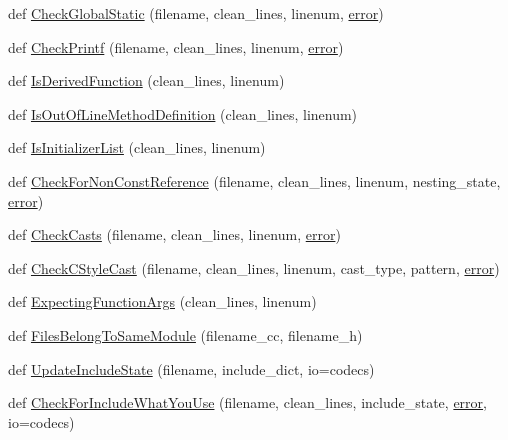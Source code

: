\begin{DoxyCompactItemize}
\item 
def \hyperlink{namespacecpplint_a64fc322bcf08988b43f003ff495fbabb}{Check\+Global\+Static} (filename, clean\+\_\+lines, linenum, \hyperlink{_07copy_08_2_read_camera_model_8m_ac546fdc9911f4a876dbfaffbc7426f8b}{error})
\item 
def \hyperlink{namespacecpplint_aaa8b988b9e83ad1c8964ecc0739d52e5}{Check\+Printf} (filename, clean\+\_\+lines, linenum, \hyperlink{_07copy_08_2_read_camera_model_8m_ac546fdc9911f4a876dbfaffbc7426f8b}{error})
\item 
def \hyperlink{namespacecpplint_ac8519cf084d818c931eac29994b03f55}{Is\+Derived\+Function} (clean\+\_\+lines, linenum)
\item 
def \hyperlink{namespacecpplint_a52e4468f674e140c256254eb0d1cf007}{Is\+Out\+Of\+Line\+Method\+Definition} (clean\+\_\+lines, linenum)
\item 
def \hyperlink{namespacecpplint_ae06fb1dd669681214573c0441b7e854f}{Is\+Initializer\+List} (clean\+\_\+lines, linenum)
\item 
def \hyperlink{namespacecpplint_a97f01c7d6e7e6d38b52744ab393d4160}{Check\+For\+Non\+Const\+Reference} (filename, clean\+\_\+lines, linenum, nesting\+\_\+state, \hyperlink{_07copy_08_2_read_camera_model_8m_ac546fdc9911f4a876dbfaffbc7426f8b}{error})
\item 
def \hyperlink{namespacecpplint_a59c5f44ae1dbedad109809d46e80588e}{Check\+Casts} (filename, clean\+\_\+lines, linenum, \hyperlink{_07copy_08_2_read_camera_model_8m_ac546fdc9911f4a876dbfaffbc7426f8b}{error})
\item 
def \hyperlink{namespacecpplint_ac23d9b29d869054db2ece1e7d5196349}{Check\+C\+Style\+Cast} (filename, clean\+\_\+lines, linenum, cast\+\_\+type, pattern, \hyperlink{_07copy_08_2_read_camera_model_8m_ac546fdc9911f4a876dbfaffbc7426f8b}{error})
\item 
def \hyperlink{namespacecpplint_a7657def0315cfe229ba436632f2d5042}{Expecting\+Function\+Args} (clean\+\_\+lines, linenum)
\item 
def \hyperlink{namespacecpplint_a66083e7d453e845a2751e76043fcd9ea}{Files\+Belong\+To\+Same\+Module} (filename\+\_\+cc, filename\+\_\+h)
\item 
def \hyperlink{namespacecpplint_a127416bee5c376937479b3119a727817}{Update\+Include\+State} (filename, include\+\_\+dict, io=codecs)
\item 
def \hyperlink{namespacecpplint_a8e1a5bea9f77246f8a0ae98a23d8d04e}{Check\+For\+Include\+What\+You\+Use} (filename, clean\+\_\+lines, include\+\_\+state, \hyperlink{_07copy_08_2_read_camera_model_8m_ac546fdc9911f4a876dbfaffbc7426f8b}{error}, io=codecs)

\end{DoxyCompactItemize}
